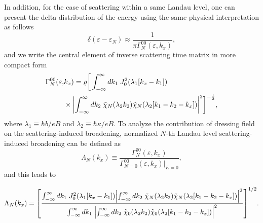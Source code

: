 In addition, for the case of scattering within a same Landau level, one can present the delta distribution of the energy using the same physical interpretation \cite{dini16} as follows
\begin{equation} \label{eq_16}
 \delta(\varepsilon - \varepsilon_{N}) \approx
 \frac{1}{\pi \Gamma^{00}_{N}(\varepsilon,k_x)},
\end{equation}
and we write the central element of inverse scattering time matrix in more compact form
\begin{equation} \label{eq_17}
  \begin{aligned}
    \Gamma^{00}_{N}(\varepsilon,& k_x) =
    \varrho
    \bigg[
    \int_{-\infty}^{\infty} d {k}_1 \;
    J_0^2\qty(\lambda_1[{k}_x - {k}_1]) \\
    & \times
    \qty|
    \int_{-\infty}^{\infty} d{k}_2 \;
    \tilde{\chi}_{N}\qty(\lambda_2 k_2)
    \tilde{\chi}_{N}\qty(\lambda_2 \qty[{k}_1 - {k}_2 - {k}_x])|^2
    \bigg]^{-\frac{1}{2}},
  \end{aligned}
\end{equation}
where $ \lambda_1 \equiv \hbar b/eB$ and  $\lambda_2 \equiv \hbar \kappa/eB$.
To analyze the contribution of dressing field on the scattering-induced broadening, normalized $N$-th Landau level scattering-induced broadening can be defined as
\begin{equation} \label{eq_18}
    \Lambda_N(k_x) \equiv
    \frac{\Gamma^{00}_{N}(\varepsilon,k_x)}{\Gamma^{00}_{N=0}(\varepsilon,k_x)\big|_{E=0}},
\end{equation}
and this leads to
\begin{widetext}
\begin{equation} \label{eq_19}
    \Lambda_N (k_x) =
    \qty[
    \frac
    {\int_{-\infty}^{\infty} d {k}_1 \;
    J_0^2\qty(\lambda_1[{k}_x - {k}_1])
    \qty|
    \int_{-\infty}^{\infty} d{k}_2 \;
    \tilde{\chi}_{N}\qty(\lambda_2 k_2)
    \tilde{\chi}_{N}\qty(\lambda_2 \qty[{k}_1 - {k}_2 - {k}_x])|^2}
    {\int_{-\infty}^{\infty} d {k}_1 \;
    \qty|
    \int_{-\infty}^{\infty} d{k}_2 \;
    \tilde{\chi}_{0}\qty(\lambda_2 k_2)
    \tilde{\chi}_{0}\qty(\lambda_2 \qty[{k}_1 - {k}_2 - {k}_x])|^2}
    ]^{1/2}.
\end{equation}
\end{widetext}

